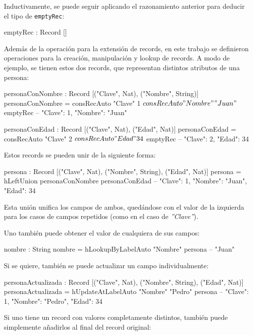 Inductivamente, se puede seguir aplicando el razonamiento anterior para deducir el tipo de \texttt{emptyRec}:

\begin{code}
emptyRec : Record []
\end{code}

Además de la operación para la extensión de records, en este trabajo se definieron operaciones para la creación, manipulación y lookup de records. A modo de ejemplo, se tienen estos dos records, que representan distintos atributos de una persona:

\begin{code}
personaConNombre : Record [("Clave", Nat), ("Nombre", String)]
personaConNombre = consRecAuto "Clave" 1 $
  consRecAuto "Nombre" "Juan" $
  emptyRec
-- { "Clave": 1, "Nombre": "Juan" }

personaConEdad : Record [("Clave", Nat), ("Edad", Nat)]
personaConEdad = consRecAuto "Clave" 2 $
  consRecAuto "Edad" 34 $
  emptyRec
-- { "Clave": 2, "Edad": 34 }
\end{code}

Estos records se pueden unir de la siguiente forma:

\begin{code}
persona : Record [("Clave", Nat), ("Nombre", String),
  ("Edad", Nat)]
persona = hLeftUnion personaConNombre personaConEdad
-- { "Clave": 1, "Nombre": "Juan", "Edad": 34 }
\end{code}

Esta unión unifica los campos de ambos, quedándose con el valor de la izquierda para los casos de campos repetidos (como en el caso de \textit{''Clave''}).

Uno también puede obtener el valor de cualquiera de sus campos:

\begin{code}
nombre : String
nombre = hLookupByLabelAuto "Nombre" persona
-- "Juan"
\end{code}

Si se quiere, también se puede actualizar un campo individualmente:

\begin{code}
personaActualizada : Record [("Clave", Nat), ("Nombre", String),
  ("Edad", Nat)]
personaActualizada = hUpdateAtLabelAuto "Nombre" "Pedro" persona
-- { "Clave": 1, "Nombre": "Pedro", "Edad": 34 }
\end{code}

Si uno tiene un record con valores completamente distintos, también puede simplemente añadirlos al final del record original:

